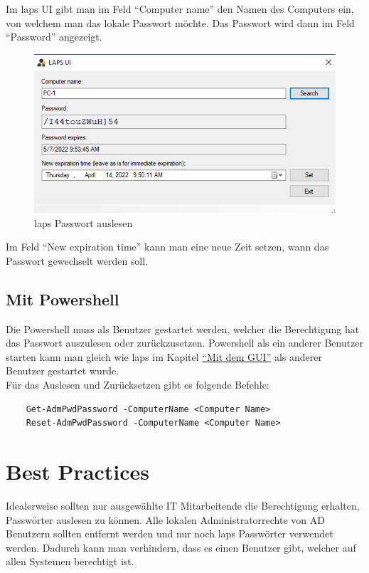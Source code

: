 Im \acrshort{laps} UI gibt man im Feld ``Computer name'' den Namen des Computers ein, von welchem man das lokale Passwort möchte.
Das Passwort wird dann im Feld ``Password'' angezeigt.
\begin{figure}[H]
    \centering
    \includegraphics[width=\linewidth]{../img/LAPS/Laps-ui.png}
    \caption{\acrshort{laps} Passwort auslesen}
\end{figure}
Im Feld ``New expiration time'' kann man eine neue Zeit setzen, wann das Passwort gewechselt werden soll.

\subsection{Mit Powershell}
Die Powershell muss als Benutzer gestartet werden, welcher die Berechtigung hat das Passwort auszulesen oder zurückzusetzen.
Powershell als ein anderer Benutzer starten kann man gleich wie \acrshort{laps} im Kapitel \hyperref[subsec:laps-gui-usage]{``Mit dem GUI''} als anderer Benutzer gestartet wurde.\\

Für das Auslesen und Zurücksetzen gibt es folgende Befehle:
\begin{lstlisting}
    Get-AdmPwdPassword -ComputerName <Computer Name>
    Reset-AdmPwdPassword -ComputerName <Computer Name>
\end{lstlisting}


\section{Best Practices}
Idealerweise sollten nur ausgewählte IT Mitarbeitende die Berechtigung erhalten, Passwörter auslesen zu können.
Alle lokalen Administratorrechte von AD Benutzern sollten entfernt werden und nur noch \acrshort{laps} Passwörter verwendet werden.
Dadurch kann man verhindern, dass es einen Benutzer gibt, welcher auf allen Systemen berechtigt ist.\\

